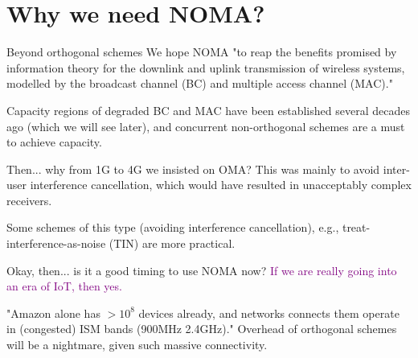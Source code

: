 \documentclass[aspectratio=43, 10pt]{beamer}
\begin{document}
\section{Why we need NOMA?}
  \begin{frame}[t]{Beyond orthogonal schemes}
    \vspace{-0.8em}
     We hope NOMA "to reap the benefits promised by information theory for the downlink and uplink transmission of wireless systems, modelled by the broadcast channel (BC) and multiple access channel (MAC)."

     \vfill
     
     Capacity regions of degraded BC and MAC have been established several decades ago (which we will see later), and concurrent non-orthogonal schemes are a must to achieve capacity.
    
    \pause
    \begin{block}{Then... why from 1G to 4G we insisted on OMA?}
       This was mainly to avoid inter-user interference cancellation, which would have resulted in unacceptably complex receivers. 
       
       Some schemes of this type (avoiding interference cancellation), e.g., treat-interference-as-noise (TIN) are more practical. 
    \end{block}

    \pause
    \begin{block}{Okay, then... is it a good timing to use NOMA now?}
       \textcolor{purple}{If we are really going into an era of IoT, then yes.} 
       
       "Amazon alone has $>10^8$ devices already, and networks connects them operate in (congested) ISM bands (900MHz 2.4GHz)." Overhead of orthogonal schemes will be a nightmare, given such massive connectivity. 
    \end{block}  
  \end{frame}
    
\end{document}
